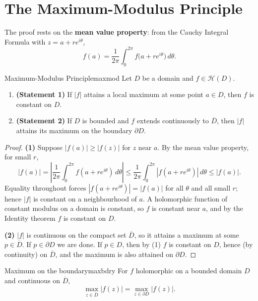 \documentclass[11pt,openany]{report}
\newcommand{\abs}[1]{\left\lvert #1 \right\rvert}
\newcommand{\Hol}{\mathcal{H}}
\begin{document}
\section{The Maximum-Modulus Principle}

The proof rests on the \textbf{mean value property}: from the Cauchy Integral Formula with
$z=a+re^{i\theta}$,
\[
  f(a) = \frac{1}{2\pi}\int_0^{2\pi} f\bigl(a+re^{i\theta}\bigr)\,d\theta .
\]

\begin{theorem}{Maximum-Modulus Principle}{maxmod}
Let $D$ be a domain and $f\in\Hol(D)$.
\begin{enumerate}[label=\textup{(\arabic*)},leftmargin=2em]
  \item \textbf{(Statement 1)} If $\abs{f}$ attains a local maximum at some point $a\in D$,
        then $f$ is constant on $D$.
  \item \textbf{(Statement 2)} If $D$ is bounded and $f$ extends continuously to
        $\overline D$, then $\abs f$ attains its maximum on the boundary $\partial D$.
\end{enumerate}
\end{theorem}

\begin{proof}
\textbf{(1)} Suppose $\abs{f(a)}\ge\abs{f(z)}$ for $z$ near $a$. By the mean value property,
for small $r$,
\[
  \abs{f(a)} = \left\lvert \frac{1}{2\pi}\int_0^{2\pi} f(a+re^{i\theta})\,d\theta\right\rvert
  \le \frac{1}{2\pi}\int_0^{2\pi}\abs{f(a+re^{i\theta})}\,d\theta \le \abs{f(a)}.
\]
Equality throughout forces $\abs{f(a+re^{i\theta})}=\abs{f(a)}$ for all $\theta$ and all
small $r$; hence $\abs f$ is constant on a neighbourhood of $a$. A holomorphic function of
constant modulus on a domain is constant, so $f$ is constant near $a$, and by the Identity
theorem $f$ is constant on $D$.

\textbf{(2)} $\abs f$ is continuous on the compact set $\overline D$, so it attains a
maximum at some $p\in\overline D$. If $p\in\partial D$ we are done. If $p\in D$, then by
(1) $f$ is constant on $D$, hence (by continuity) on $\overline D$, and the maximum is also
attained on $\partial D$.
\end{proof}

\begin{corollary}{Maximum on the boundary}{maxbdry}
For $f$ holomorphic on a bounded domain $D$ and continuous on $\overline D$,
\[
  \max_{z\in\overline D}\abs{f(z)} = \max_{z\in\partial D}\abs{f(z)}.
\]
\end{corollary}
\end{document}
